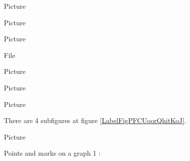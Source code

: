 Picture 
\begin{center}

\end{center}



Picture 
\begin{center}

\end{center}




Picture 
\begin{center}
   
\end{center}
   


File 
\begin{center}

\end{center}



\clearpage

Picture 
\begin{center}

\end{center}


Picture 
\begin{center}
   
\end{center}
   


   Picture 
\begin{center}

\end{center}




\clearpage


There are 4 subfigures at figure \ref{LabelFigPFCUoorQhitKoJ}. %
\newcommand{\CaptionFigPFCUoorQhitKoJ}{4 subfigures still to be descripted.}



\clearpage


Picture 
\begin{center}

\end{center}



Points and marks on a graph 1 :

